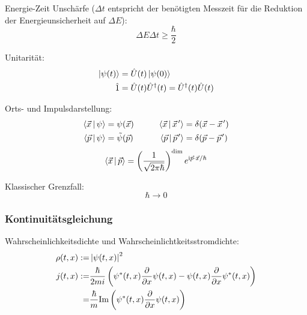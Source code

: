 		\noindent
		Energie-Zeit Unschärfe ($\Delta t$ entspricht der benötigten Messzeit für die Reduktion der Energieunsicherheit auf $\Delta E$):
		\begin{equation}
			\Delta E \Delta t \ge \frac{\hbar}{2}
		\end{equation}

		\noindent
		Unitarität:
		\begin{equation}
			\begin{aligned}
				\Ket{\psi(t)} &= \hat{U}(t) \Ket{\psi(0)} \\
				\hat{1} &= \hat{U}(t)\hat{U}^\dagger(t) = \hat{U}^\dagger(t)\hat{U}(t) \\
			\end{aligned}
		\end{equation}

		\noindent
		Orts- und Impulsdarstellung:
		\begin{equation}
			\begin{aligned}
				\Braket{\vec{x} | \psi} &= \psi(\vec{x}) &\hspace{20pt}
				\Braket{\vec{x} | \pvec{x}'} &= \delta(\vec{x} - \pvec{x}') \\
				\Braket{\vec{p} | \psi} &= \tilde{\psi}(\vec{p}) &\hspace{20pt}
				\Braket{\vec{p} | \pvec{p}'} &= \delta(\vec{p} - \pvec{p}') \\
			\end{aligned}
		\end{equation}
		\begin{equation}
			\begin{aligned}
				\Braket{\vec{x} | \vec{p}} &= \left( \frac{1}{\sqrt{2\pi\hbar}} \right)^\mathrm{dim} e^{\mathrm{i} \vec{p}\cdot\vec{x} / \hbar} \\
			\end{aligned}
		\end{equation}

		\noindent
		Klassischer Grenzfall:
		\begin{equation}
			\hbar \rightarrow 0
		\end{equation}

		\subsubsection{Kontinuitätsgleichung}
			\noindent
			Wahrscheinlichkeitsdichte und Wahrscheinlichtkeitsstromdichte:
			\begin{equation}
				\begin{aligned}
					\rho(t,x) :=& \left|\psi(t,x)\right|^2 \\
					j(t,x) :=& \frac{\hbar}{2mi}\left(
						\psi^*(t,x)\frac{\partial }{\partial x}\psi(t,x) - \psi(t,x)\frac{\partial }{\partial x}\psi^*(t,x)
					\right) \\
					=& \frac{\hbar}{m} \mathrm{Im}\left(
						\psi^*(t,x) \frac{\partial }{\partial x}\psi(t,x)
					\right)\\
				\end{aligned}
			\end{equation}

